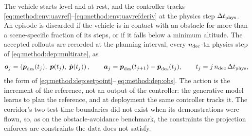 The vehicle starts level and at rest, and the controller tracks
\eqref{eq:method:env:uavref}--\eqref{eq:method:env:uavrefderiv} at the physics step $\Delta t_{\textrm{phys}}$.
An episode is discarded if the vehicle is in contact with an obstacle for more than a scene-specific
fraction of its steps, or if it falls below a minimum altitude. The accepted rollouts are recorded at the
planning interval, every $n_{\textrm{dec}}$-th physics step of \eqref{eq:method:dep:multirate}, as
\begin{equation}\label{eq:method:env:uavdata}
  \boldsymbol{o}_{j} = \left(\boldsymbol{p}_{\textrm{des}}(t_{j}),\;\boldsymbol{p}(t_{j}),\;\dot{\boldsymbol{p}}(t_{j})\right),
  \qquad
  \boldsymbol{a}_{j} = \boldsymbol{p}_{\textrm{des}}(t_{j+1}) - \boldsymbol{p}_{\textrm{des}}(t_{j}),
  \qquad
  t_{j} = j\,n_{\textrm{dec}}\,\Delta t_{\textrm{phys}},
\end{equation}
the form of \eqref{eq:method:dep:setpoint}--\eqref{eq:method:dep:obs}. The action is the increment of
the reference, not an output of the controller: the generative model learns to plan the reference,
and at deployment the same controller tracks it. The corridor's two test-time boundaries did not exist
when its demonstrations were flown, so, as on the obstacle-avoidance benchmark, the constraints the
projection enforces are constraints the data does not satisfy.


